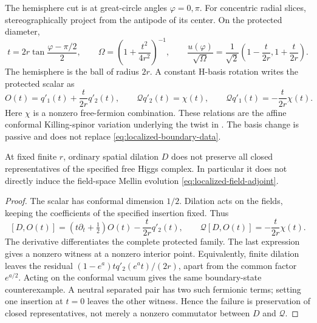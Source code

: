 The hemisphere cut is at great-circle angles $\varphi=0,\pi$.
For concentric radial slices, stereographically project from the
antipode of its center. On the protected diameter,
\begin{equation}\label{eq:localized-centered-frame}
 t=2r\tan\frac{\varphi-\pi/2}{2},\qquad
 \Omega=\left(1+\frac{t^2}{4r^2}\right)^{-1},\qquad
 \frac{u(\varphi)}{\sqrt{\Omega}}
 =\frac1{\sqrt2}\left(1-\frac{t}{2r},1+\frac{t}{2r}\right).
\end{equation}
The hemisphere is the ball of radius $2r$. A constant H-basis
rotation writes the protected scalar as
\begin{equation}\label{eq:localized-protected-family}
 O(t)=q'_1(t)+\frac{t}{2r}q'_2(t),\qquad
 \mathcal Qq'_2(t)=\chi(t),\qquad
 \mathcal Qq'_1(t)=-\frac{t}{2r}\chi(t).
\end{equation}
Here $\chi$ is a nonzero free-fermion combination. These relations
are the affine conformal Killing-spinor variation underlying the
twist in \cite[equations~(3.1)--(3.5)]{DPYHiggs}. The basis change
is passive and does not replace \eqref{eq:localized-boundary-data}.

\begin{proposition}
\label{prop:localized-nondescent}
At fixed finite $r$, ordinary spatial dilation $D$ does not preserve
all closed representatives of the specified free Higgs complex.
In particular it does not directly induce the field-space Mellin
evolution \eqref{eq:localized-field-adjoint}.
\end{proposition}
\begin{proof}
The scalar has conformal dimension $1/2$. Dilation acts on the
fields, keeping the coefficients of the specified insertion fixed.
Thus
\begin{equation}\label{eq:localized-nonclosure}
 [D,O(t)]=(t\partial_t+\tfrac12)O(t)
                   -\frac{t}{2r}q'_2(t),\qquad
 \mathcal Q[D,O(t)]=-\frac{t}{2r}\chi(t).
\end{equation}
The derivative differentiates the complete protected family.
The last expression gives a nonzero witness at a nonzero interior
point. Equivalently, finite dilation leaves the residual
$(1-e^a)tq'_2(e^at)/(2r)$, apart from the common factor $e^{a/2}$.
Acting on the conformal vacuum gives the same boundary-state
counterexample. A neutral separated pair has two such fermionic
terms; setting one insertion at $t=0$ leaves the other witness.
Hence the failure is preservation of closed representatives,
not merely a nonzero commutator between $D$ and $\mathcal Q$.
\end{proof}

